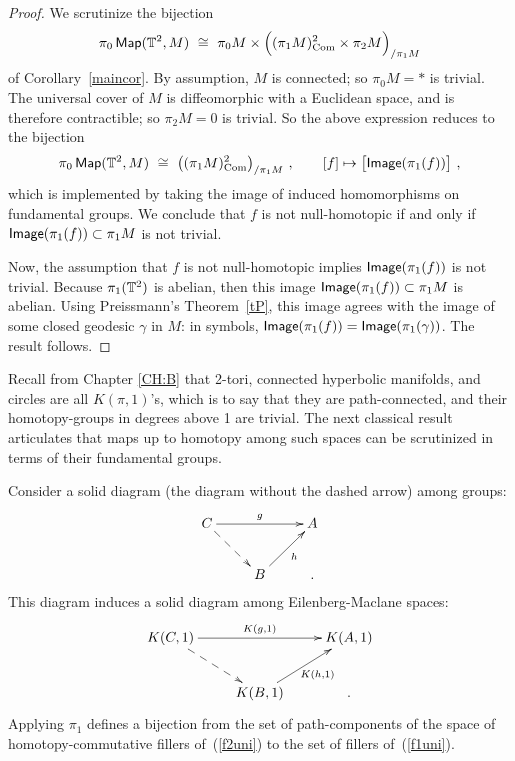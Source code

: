 \begin{proof}
We scrutinize the bijection 
\[
\pi_{0}\operatorname{{\sf Map}}(\mathbb T^2,M) 
~\cong~ \pi_{0}M \times \Bigl( (\pi_1M)^{2}_{\rm Com} \times \pi_2M \Bigr)_{/\pi_1M}
\]
of Corollary~\ref{maincor}.
By assumption, $M$ is connected; so $\pi_0M = \ast$ is trivial.
The universal cover of $M$ is diffeomorphic with a Euclidean space, and is therefore contractible; so $\pi_2M = 0$ is trivial.
So the above expression reduces to the bijection
\[
\pi_0\operatorname{{\sf Map}}(\mathbb T^2,M) 
~\cong~
\bigl( (\pi_1M)^{2}_{\rm Com} \bigr)_{/\pi_1M}
~,\qquad
[f]
\mapsto
\bigl[ {\sf Image}(\pi_1(f)) \bigr]
~,
\]
which is implemented by taking the image of induced homomorphisms on fundamental groups.
We conclude that $f$ is not null-homotopic if and only if ${\sf Image}(\pi_1(f)) \subset \pi_{1}M$ is not trivial.

Now, the assumption that $f$ is not null-homotopic implies ${\sf Image}(\pi_1(f))$ is not trivial.
Because $\pi_1(\mathbb T^2)$ is abelian, then this image ${\sf Image}(\pi_1(f))\subset \pi_{1}M$ is abelian.
Using Preissmann's Theorem~\ref{tP}, this image agrees with the image of some closed geodesic $\gamma$ in $M$:
in symbols,
${\sf Image}(\pi_1(f)) = {\sf Image}(\pi_1(\gamma))$.
The result follows.  
\end{proof}

Recall from Chapter \ref{CH:B} that 2-tori, connected hyperbolic manifolds, and circles are all $K(\pi,1)$'s, which is to say that they are path-connected, and their homotopy-groups in degrees above 1 are trivial.
The next classical result articulates that maps up to homotopy among such spaces can be scrutinized in terms of their fundamental groups.
\begin{prop}
\label{t4uni}
Consider a solid diagram (the diagram without the dashed arrow) among groups:
\begin{equation}
\label{f1uni}
\xymatrix{
C
\ar[rr]^-{g}
\ar@{-->}[dr]
&&
A
\\
&
B
\ar[ur]_-{h}
&
.
}
\end{equation}
This diagram induces a solid diagram among Eilenberg-Maclane spaces:
\begin{equation}
\label{f2uni}
\xymatrix{
K(C,1)
\ar[rr]^-{K(g,1)}
\ar@{-->}[dr]
&&
K(A,1)
\\
&
K(B,1)
\ar[ur]_-{K(h,1)}
&
.
}
\end{equation}
Applying $\pi_1$ defines a bijection from
the set of path-components of the space of homotopy-commutative fillers of~(\ref{f2uni})
to the set of fillers of~(\ref{f1uni}).
\end{prop}

